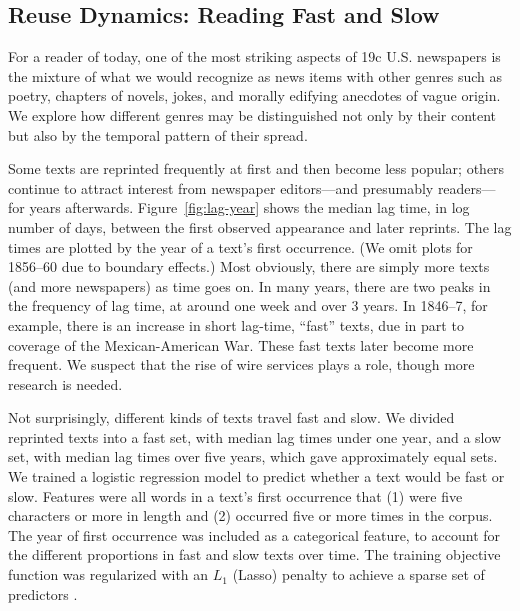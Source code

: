 \documentclass[pdftex,11pt]{article}
\begin{document}
\subsection{Reuse Dynamics: Reading Fast and Slow}
\label{sec:fast-slow}

For a reader of today, one of the most striking aspects of 19c
U.S. newspapers is the mixture of what we would recognize as news
items with other genres such as poetry, chapters of novels, jokes, and
morally edifying anecdotes of vague origin.  We explore how different
genres may be distinguished not only by their content but also by the
temporal pattern of their spread.

Some texts are reprinted frequently at first and then become less
popular; others continue to attract interest from newspaper
editors---and presumably readers---for years afterwards.
Figure~\ref{fig:lag-year} shows the median lag time, in log number of
days, between the first observed appearance and later reprints.  The
lag times are plotted by the year of a text's first occurrence.  (We
omit plots for 1856--60 due to boundary effects.)  Most obviously,
there are simply more texts (and more newspapers) as time goes on.  In
many years, there are two peaks in the frequency of lag time, at
around one week and over 3 years.  In 1846--7, for example, there is
an increase in short lag-time, ``fast'' texts, due in part to coverage
of the Mexican-American War.  These fast texts later become more
frequent.  We suspect that the rise of wire services plays a role,
though more research is needed.

Not surprisingly, different kinds of texts travel fast and slow.  We
divided reprinted texts into a fast set, with median lag times under
one year, and a slow set, with median lag times over five years, which
gave approximately equal sets.  We trained a logistic regression model
to predict whether a text would be fast or slow.  Features were all
words in a text's first occurrence that (1) were five characters or
more in length and (2) occurred five or more times in the corpus.  The
year of first occurrence was included as a categorical feature, to
account for the different proportions in fast and slow texts over
time.  The training objective function was regularized with an $L_1$
(Lasso) penalty to achieve a sparse set of predictors
\citep{friedman08:_regul_paths_gener_linear_model_coord_descen}.
\end{document}
